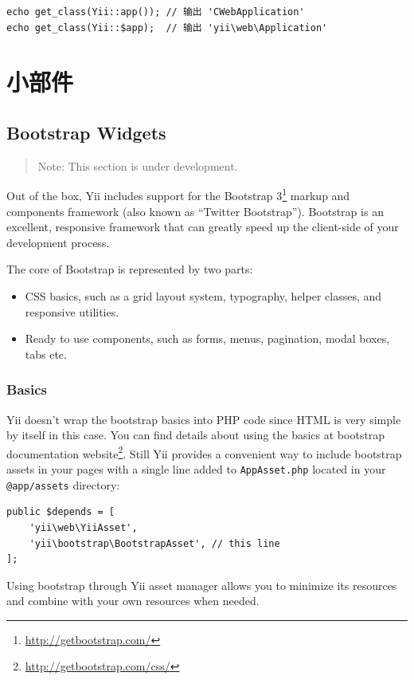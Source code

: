 \lstset{language=php}\begin{lstlisting}
echo get_class(Yii::app()); // 输出 'CWebApplication'
echo get_class(Yii::$app);  // 输出 'yii\web\Application'
\end{lstlisting}


\chapter{小部件}
\label{widget-bootstrap.md}\section{Bootstrap Widgets}
\begin{quote}Note: This section is under development.

\end{quote}
Out of the box, Yii includes support for the Bootstrap 3\footnote{\url{http://getbootstrap.com/}} markup and components framework
(also known as ``Twitter Bootstrap''). Bootstrap is an excellent, responsive framework that can greatly speed up the
client-side of your development process.

The core of Bootstrap is represented by two parts:

\begin{itemize}
\item CSS basics, such as a grid layout system, typography, helper classes, and responsive utilities.
\item Ready to use components, such as forms, menus, pagination, modal boxes, tabs etc.
\end{itemize}
\subsection{Basics}
Yii doesn't wrap the bootstrap basics into PHP code since HTML is very simple by itself in this case. You can find details
about using the basics at bootstrap documentation website\footnote{\url{http://getbootstrap.com/css/}}. Still Yii provides a
convenient way to include bootstrap assets in your pages with a single line added to \lstinline|AppAsset.php| located in your
\lstinline|@app/assets| directory:

\lstset{language=php}\begin{lstlisting}
public $depends = [
    'yii\web\YiiAsset',
    'yii\bootstrap\BootstrapAsset', // this line
];
\end{lstlisting}
Using bootstrap through Yii asset manager allows you to minimize its resources and combine with your own resources when
needed.


